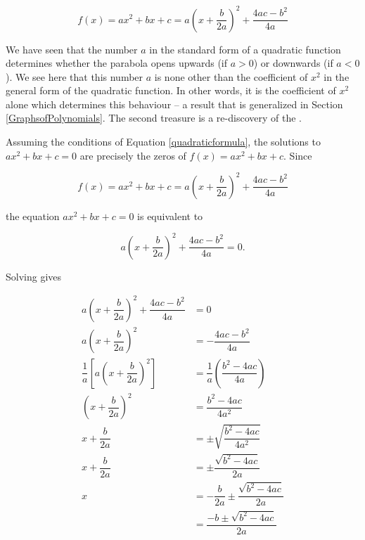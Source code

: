 \[ f(x) = ax^2 + bx + c =  a\left(x+\dfrac{b}{2a}\right)^2 + \dfrac{4ac - b^2}{4a}\]


We have seen that the number $a$ in the standard form of a quadratic function determines whether the parabola opens upwards (if $a>0$) or downwards (if $a < 0$).  We see here that this number $a$ is none other than the coefficient of $x^2$ in the general form of the quadratic function.  In other words, it is the coefficient of $x^2$ alone which determines this behaviour -- a result that is generalized in Section \ref{GraphsofPolynomials}.  The second treasure is a re-discovery of the  .

\smallskip


\smallskip

Assuming the conditions of Equation \ref{quadraticformula}, the solutions to $ax^2+bx+c = 0$ are precisely the zeros of $f(x) = ax^2 + bx + c$. Since

\[ f(x) = ax^2+bx+c = a\left(x+\dfrac{b}{2a}\right)^2 + \dfrac{4ac - b^2}{4a}\]

the equation $ax^2 + bx + c = 0$ is equivalent to

\[a\left(x+\dfrac{b}{2a}\right)^2 + \dfrac{4ac - b^2}{4a} = 0.\]

Solving gives 

\begin{align*}
 a\left(x+\dfrac{b}{2a}\right)^2 + \dfrac{4ac - b^2}{4a} & =  0  \\ 
  a\left(x+\dfrac{b}{2a}\right)^2  & =  - \dfrac{4ac - b^2}{4a}  \\[3pt]
  \dfrac{1}{a} \left[a\left(x+\dfrac{b}{2a}\right)^2\right] & =  \dfrac{1}{a} \left(\dfrac{b^2-4ac}{4a}\right)  \\[3pt]
 \left(x+\dfrac{b}{2a}\right)^2 & =  \dfrac{b^2-4ac}{4a^2} \\[3pt]
  x+\dfrac{b}{2a} & =  \pm \sqrt{\dfrac{b^2-4ac}{4a^2}}  \tag*{extract square roots} \\[3pt]
  x+\dfrac{b}{2a} & =  \pm \dfrac{\sqrt{b^2-4ac}}{2a}  \\[3pt]
  x & =  -\dfrac{b}{2a} \pm \dfrac{\sqrt{b^2-4ac}}{2a} \\[3pt]
    & =  \dfrac{-b \pm \sqrt{b^2-4ac}}{2a}
\end{align*}

